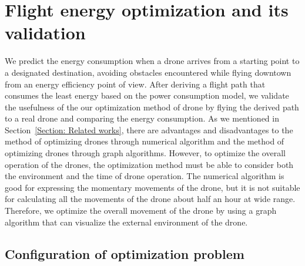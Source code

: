 \documentclass[journal]{./template/IEEEtran}
\begin{document}
\section{Flight energy optimization and its validation}
We predict the energy consumption when a drone arrives from a starting point to a designated destination, avoiding obstacles encountered while flying downtown from an energy efficiency point of view. After deriving a flight path that consumes the least energy based on the power consumption model, we validate the usefulness of the our optimization method of drone by flying the derived path to a real drone and comparing the energy consumption.
As we mentioned in Section~\ref{Section: Related works}, there are advantages and disadvantages to the method of optimizing drones through numerical algorithm and the method of optimizing drones through graph algorithms.
However, to optimize the overall operation of the drones, the optimization method must be able to consider both the environment and the time of drone operation. 
The numerical algorithm is good for expressing the momentary movements of the drone, but it is not suitable for calculating all the movements of the drone about half an hour at wide range.
Therefore, we optimize the overall movement of the drone by using a graph algorithm that can visualize the external environment of the drone.





\subsection{Configuration of optimization problem}
\end{document}

